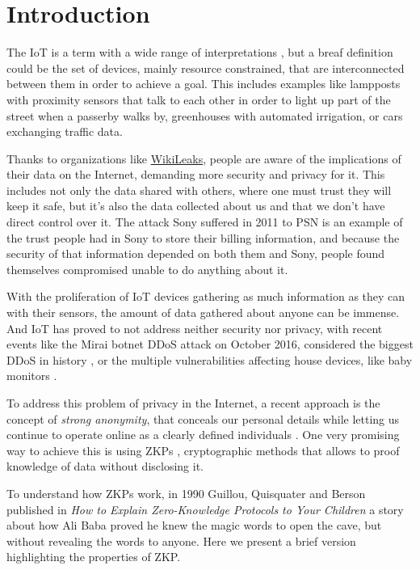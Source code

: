 \chapter{Introduction}\label{ch:introduction}

The \ac{IoT} is a term with a wide range of interpretations \citep{Atzori20102787}, but a breaf definition could be the set of devices, mainly resource constrained, that are interconnected between them in order to achieve a goal. This includes examples like lampposts with proximity sensors that talk to each other in order to light up part of the street when a passerby walks by, greenhouses with automated irrigation, or cars exchanging traffic data.

Thanks to organizations like \href{https://wikileaks.org/}{WikiLeaks}, people are aware of the implications of their data on the Internet, demanding more security and privacy for it. This includes not only the data shared with others, where one must trust they will keep it safe, but it's also the data collected about us and that we don't have direct control over it. The attack Sony suffered in 2011 to PSN \citep{PSN2011} is an example of the trust people had in Sony to store their billing information, and because the security of that information depended on both them and Sony, people found themselves compromised unable to do anything about it. 

With the proliferation of IoT devices gathering as much information as they can with their sensors, the amount of data gathered about anyone can be immense. And IoT has proved to not address neither security nor privacy, with recent events like the Mirai botnet DDoS attack on October 2016, considered the biggest DDoS in history \citep{jeyanthi:2017}, or the multiple vulnerabilities affecting house devices, like baby monitors \citep{rapid7babycam}.


To address this problem of privacy in the Internet, a recent approach is the concept of \textit{strong anonymity}, that conceals our personal details while letting us continue to operate online as a clearly defined individuals \citep{stronganonymity}. One very promising way to achieve this is using \acp{ZKP}
, cryptographic methods that allows to proof knowledge of data without disclosing it.

To understand how ZKPs work, in 1990 Guillou, Quisquater and Berson published in \textit{How to Explain Zero-Knowledge Protocols to Your Children} \citep{ZKPcave:story} a story about how Ali Baba proved he knew the magic words to open the cave, but without revealing the words to anyone. Here we present a brief version highlighting the properties of ZKP.

